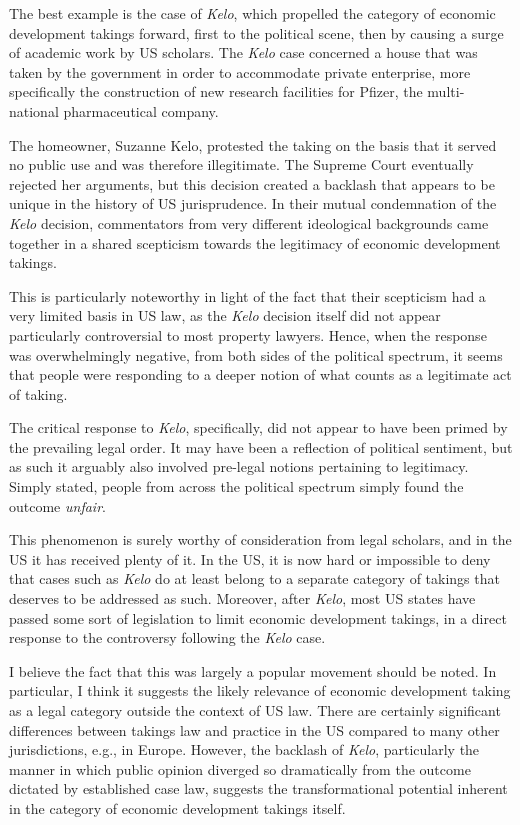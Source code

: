 The best example is the case of {\it Kelo}, which propelled the category of economic development takings forward, first to the political scene, then by causing a surge of academic work by US scholars. 
The {\it Kelo} case concerned a house that was taken by the government in order to accommodate private enterprise, more specifically the construction of new research facilities for Pfizer, the multi-national pharmaceutical company.

The homeowner, Suzanne Kelo, protested the taking on the basis that it served no public use and was therefore illegitimate. The Supreme Court eventually rejected her arguments, but this decision created a backlash that appears to be unique in the history of US jurisprudence. In their mutual condemnation of the {\it Kelo} decision, commentators from very different ideological backgrounds came together in a shared scepticism towards the legitimacy of economic development takings.

This is particularly noteworthy in light of the fact that their scepticism had a very limited basis in US law, as the {\it Kelo} decision itself did not appear particularly controversial to most property lawyers. Hence, when the response was overwhelmingly negative, from both sides of the political spectrum, it seems that people were responding to a deeper notion of what counts as a legitimate act of taking.

The critical response to {\it Kelo}, specifically, did not appear to have been primed by the prevailing legal order. It may have been a reflection of political sentiment, but as such it arguably also involved pre-legal notions pertaining to legitimacy. Simply stated, people from across the political spectrum simply found the outcome {\it unfair}.

This phenomenon is surely worthy of consideration from legal scholars, and in the US it has received plenty of it. In the US, it is now hard or impossible to deny that cases such as {\it Kelo} do at least belong to a separate category of takings that deserves to be addressed as such. Moreover, after {\it Kelo}, most US states have passed some sort of legislation to limit economic development takings, in a direct response to the controversy following the {\it Kelo} case. 

I believe the fact that this was largely a popular movement should be noted. In particular, I think it suggests the likely relevance of economic development taking as a legal category outside the context of US law. There are certainly significant differences between takings law and practice in the US compared to many other jurisdictions, e.g., in Europe. However, the backlash of {\it Kelo}, particularly the manner in which public opinion diverged so dramatically from the outcome dictated by established case law, suggests the transformational potential inherent in the category of economic development takings itself.

